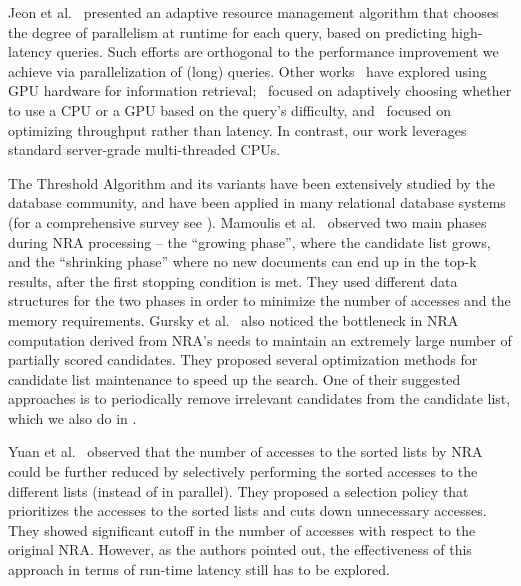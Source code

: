 Jeon et al.~\cite{Jeon:2014} 
presented an adaptive resource management algorithm that chooses the degree of parallelism at runtime for each query, based on predicting high-latency queries.
Such efforts are orthogonal to the performance improvement we achieve via parallelization of (long) queries.
Other works~\cite{Ao:2011,Liu:2018:GUC:3178487.3178512} have explored using GPU hardware for information retrieval;~\cite{Liu:2018:GUC:3178487.3178512} 
focused on adaptively choosing whether to use a CPU or a GPU based on the query's difficulty, and~\cite{Ao:2011} focused on optimizing throughput rather than latency. 
In contrast, our work leverages standard server-grade multi-threaded CPUs. 

The Threshold Algorithm and its variants \cite{Fagin:2001,Fagin:2003,Akbarinia:2007} have been extensively studied by the database community, and have been applied in many relational database systems (for a comprehensive survey see \cite{ilyas2008survey}). 
Mamoulis et al.~\cite{Mamoulis:2007} observed two main phases during NRA processing -- the ``growing phase'', where the candidate list grows, and the ``shrinking phase'' where no new documents can end up in the top-k results, after the first stopping condition is met. They used different data structures for the two phases in order to minimize the number of accesses and the memory requirements. 
Gursky et al.~\cite{Gursky:2008} also noticed the bottleneck in NRA computation derived from NRA's needs to maintain an extremely large number of partially scored candidates. They proposed several optimization methods for candidate list maintenance to speed up the search. One of their suggested approaches is to periodically remove irrelevant candidates from the candidate list, which we also do in \alg.

Yuan et al.~\cite{yuan:2012} observed that the number of accesses to the sorted lists by NRA could be further reduced by selectively performing the sorted accesses to the different lists (instead of in parallel). They proposed a selection policy that prioritizes the accesses to the sorted lists and cuts down unnecessary accesses. They showed significant cutoff in the number of accesses with respect to the original NRA. However, 
as the authors pointed out, the effectiveness of this approach in terms of run-time latency still has to be explored.

